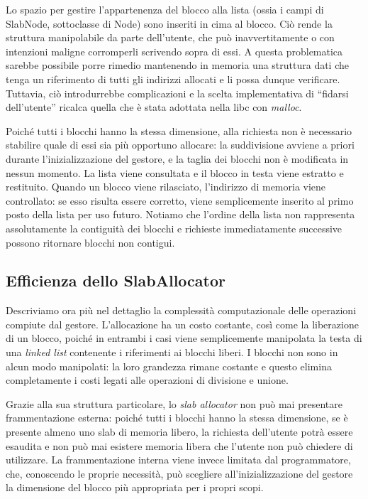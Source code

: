 Lo spazio per gestire l’appartenenza del blocco alla lista (ossia i campi di SlabNode, sottoclasse di Node) sono inseriti in cima al blocco. Ciò rende la struttura manipolabile da parte dell’utente, che può inavvertitamente o con intenzioni maligne corromperli scrivendo sopra di essi. A questa problematica sarebbe possibile porre rimedio mantenendo in memoria una struttura dati che tenga un riferimento di tutti gli indirizzi allocati e li possa dunque verificare. Tuttavia, ciò introdurrebbe complicazioni e la scelta implementativa di “fidarsi dell’utente” ricalca quella che è stata adottata nella libc con \textit{malloc}.

Poiché tutti i blocchi hanno la stessa dimensione, alla richiesta non è necessario stabilire quale di essi sia più opportuno allocare: la suddivisione avviene a priori durante l’inizializzazione del gestore, e la taglia dei blocchi non è modificata in nessun momento. La lista viene consultata e il blocco in testa viene estratto e restituito. Quando un blocco viene rilasciato, l’indirizzo di memoria viene controllato: se esso risulta essere corretto, viene semplicemente inserito al primo posto della lista per uso futuro. Notiamo che l’ordine della lista non rappresenta assolutamente la contiguità dei blocchi e richieste immediatamente successive possono ritornare blocchi non contigui.

\subsection*{Efficienza dello SlabAllocator}
Descriviamo ora più nel dettaglio la complessità computazionale delle operazioni compiute dal gestore. L’allocazione ha un costo costante, così come la liberazione di un blocco, poiché in entrambi i casi viene semplicemente manipolata la testa di una \textit{linked list} contenente i riferimenti ai blocchi liberi. I blocchi non sono in alcun modo manipolati: la loro grandezza rimane costante e questo elimina completamente i costi legati alle operazioni di divisione e unione.

Grazie alla sua struttura particolare, lo \textit{slab allocator} non può mai presentare frammentazione esterna: poiché tutti i blocchi hanno la stessa dimensione, se è presente almeno uno slab di memoria libero, la richiesta dell’utente potrà essere esaudita e non può mai esistere memoria libera che l’utente non può chiedere di utilizzare. La frammentazione interna viene invece limitata dal programmatore, che, conoscendo le proprie necessità, può scegliere all’inizializzazione del gestore la dimensione del blocco più appropriata per i propri scopi.

